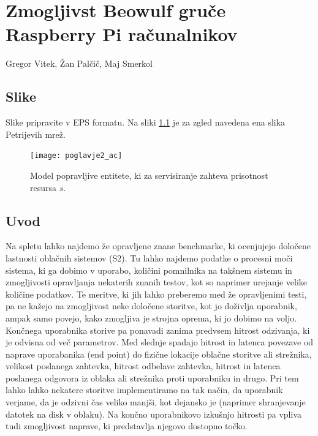 \chapter[Zmogljivst Beowulf gruče Raspberry Pi računalnikov (G. Vitek,  Ž. Palčič, M. Smerkol)]{Zmogljivst Beowulf gruče Raspberry Pi računalnikov}
\huge Gregor Vitek, Žan Palčič, Maj Smerkol\\
\normalsize
\bigskip

\section{Slike}
Slike pripravite v EPS formatu. Na sliki  \ref{fig:poglavje2_ac} je za zgled navedena ena slika Petrijevih mrež.

\begin{figure}[htbf]
\begin{center}
\texttt{[image: poglavje2\_ac]}
\end{center}
\caption{Model popravljive entitete, ki za servisiranje zahteva prisotnost resursa $s$.}
\label{fig:poglavje2_ac}
\end{figure} 


\section{Uvod}

Na spletu lahko najdemo že opravljene znane benchmarke\cite{Benchmarks}, ki ocenjujejo določene lastnosti oblačnih sistemov (S2). Tu lahko najdemo podatke o procesni moči sistema, ki ga dobimo v uporabo, količini pomnilnika na takšnem sistemu in zmogljivosti opravljanja nekaterih znanih testov, kot so naprimer urejanje velike količine podatkov. Te meritve, ki jih lahko preberemo med že opravljenimi testi, pa ne kažejo na zmogljivost neke določene storitve, kot jo doživlja uporabnik, ampak samo povejo, kako zmogljiva je strojna oprema, ki jo dobimo na voljo. Končnega uporabnika storive pa ponavadi zanima predvsem hitrost odzivanja, ki je odvisna od več parametrov.
Med slednje spadajo hitrost in latenca povezave od naprave uporabanika (end point) do fizične lokacije oblačne storitve ali strežnika, velikost poslanega zahtevka, hitrost odbelave zahtevka, hitrost in latenca poslanega odgovora iz oblaka ali strežnika proti uporabniku in drugo. Pri tem lahko lahko nekatere storitve implementiramo na tak način, da uporabnik verjame, da je odzivni čas veliko manjši, kot dejansko je (naprimer shranjevanje datotek na disk v oblaku). Na končno uporabnikovo izkušnjo hitrosti pa vpliva tudi zmogljivost naprave, ki predstavlja njegovo dostopno točko. 

